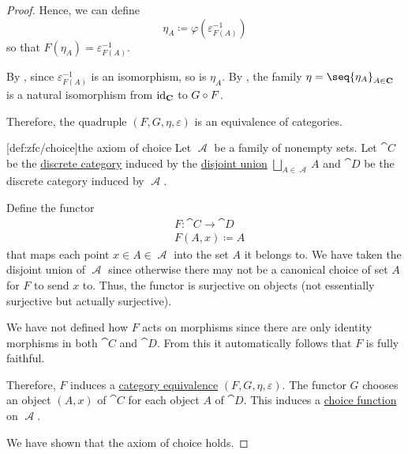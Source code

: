 \begin{proof}
  Hence, we can define
  \begin{equation*}
    \eta_A \coloneqq \varphi(\varepsilon_{F(A)}^{-1})
  \end{equation*}
  so that \( F(\eta_A) = \varepsilon_{F(A)}^{-1} \).

  By , since \( \varepsilon_{F(A)}^{-1} \) is an isomorphism, so is \( \eta_A \). By , the family \( \eta = \seq{ \eta_A }_{A \in \cat{C}} \) is a natural isomorphism from \( \operatorname{id}_{\operatorname{\mathbf{C}}} \) to \( G \bincirc F \).

  Therefore, the quadruple \( (F, G, \eta, \varepsilon) \) is an equivalence of categories.

  [def:zfc/choice]{the axiom of choice} Let \( \mscrA \) be a family of nonempty sets. Let \( \cat{C} \) be the \hyperref[ex:discrete_category]{discrete category} induced by the \hyperref[def:disjoint_union]{disjoint union} \( \bigsqcup_{A \in \mscrA} A \) and \( \cat{D} \) be the discrete category induced by \( \mscrA \).

  Define the functor
  \begin{equation*}
    \begin{aligned}
      &F: \cat{C} \to \cat{D} \\
      &F(A, x) \coloneqq A
    \end{aligned}
  \end{equation*}
  that maps each point \( x \in A \in \mscrA \) into the set \( A \) it belongs to. We have taken the disjoint union of \( \mscrA \) since otherwise there may not be a canonical choice of set \( A \) for \( F \) to send \( x \) to. Thus, the functor is surjective on objects (not essentially surjective but actually surjective).

  We have not defined how \( F \) acts on morphisms since there are only identity morphisms in both \( \cat{C} \) and \( \cat{D} \). From this it automatically follows that \( F \) is fully faithful.

  Therefore, \( F \) induces a \hyperref[def:category_equivalence]{category equivalence} \( (F, G, \eta, \varepsilon) \). The functor \( G \) chooses an object \( (A, x) \) of \( \cat{C} \) for each object \( A \) of \( \cat{D} \). This induces a \hyperref[def:choice_function]{choice function} on \( \mscrA \).

  We have shown that the axiom of choice holds.
\end{proof}

